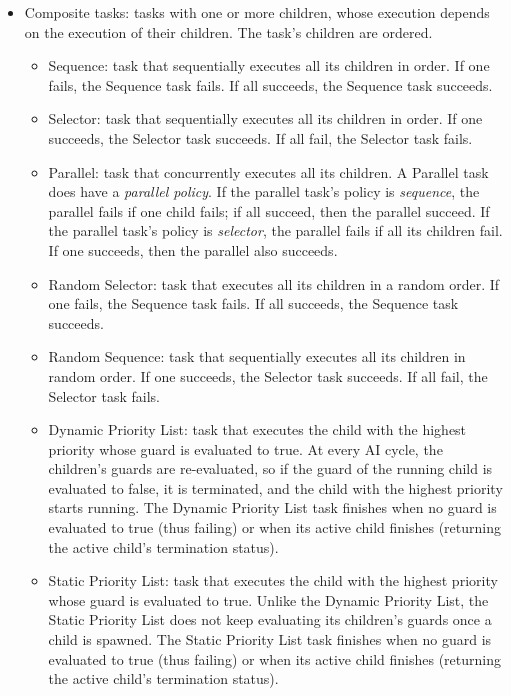 \documentclass[a4paper,10pt]{article}
\begin{document}
\begin{itemize}
  \item Composite tasks: tasks with one or more children, whose execution depends on the execution of their children. The task's children are ordered.
  \begin{itemize}
    \item Sequence: task that sequentially executes all its children in order. If one fails, the Sequence task fails. If all succeeds, the Sequence task succeeds.
    \item Selector: task that sequentially executes all its children in order. If one succeeds, the Selector task succeeds. If all fail, the Selector task fails.
    \item Parallel: task that concurrently executes all its children. A Parallel task does have a \textit{parallel policy}. If the parallel task's policy is \textit{sequence}, the parallel fails if one child fails; if all succeed, then the parallel succeed. If the parallel task's policy is \textit{selector}, the parallel fails if all its children fail. If one succeeds, then the parallel also succeeds.
    \item Random Selector: task that executes all its children in a random order. If one fails, the Sequence task fails. If all succeeds, the Sequence task succeeds.
    \item Random Sequence: task that sequentially executes all its children in random order. If one succeeds, the Selector task succeeds. If all fail, the Selector task fails.
    \item Dynamic Priority List: task that executes the child with the highest priority whose guard is evaluated to true. At every AI cycle, the children's guards are re-evaluated, so if the guard of the running child is evaluated to false, it is terminated, and the child with the highest priority starts running. The Dynamic Priority List task finishes when no guard is evaluated to true (thus failing) or when its active child finishes (returning the active child's termination status).
    \item Static Priority List: task that executes the child with the highest priority whose guard is evaluated to true. Unlike the Dynamic Priority List, the Static Priority List does not keep evaluating its children's guards once a child is spawned. The Static Priority List task finishes when no guard is evaluated to true (thus failing) or when its active child finishes (returning the active child's termination status).
  \end{itemize}

\end{itemize}
\end{document}
